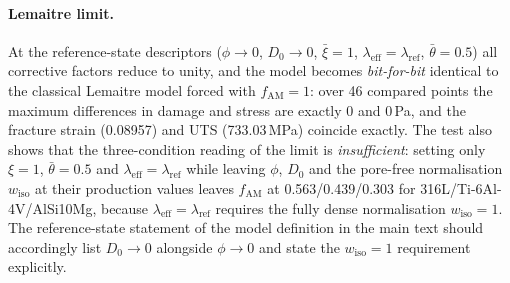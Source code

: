 \documentclass[11pt,a4paper,twocolumn]{article}
\begin{document}
\paragraph{Lemaitre limit.} At the reference-state descriptors ($\phi \to 0$, $D_0 \to 0$, $\bar\xi = 1$,
$\lambda_{\mathrm{eff}} = \lambda_{\mathrm{ref}}$, $\bar\theta = 0.5$) all corrective factors reduce to
unity, and the model becomes \emph{bit-for-bit} identical to the classical Lemaitre model forced with
$f_{\mathrm{AM}} = 1$: over 46 compared points the maximum differences in damage and stress are exactly
$0$ and $0$\,Pa, and the fracture strain (0.08957) and UTS (733.03\,MPa) coincide exactly. The test also
shows that the three-condition reading of the limit is \emph{insufficient}: setting only $\xi = 1$,
$\bar\theta = 0.5$ and $\lambda_{\mathrm{eff}} = \lambda_{\mathrm{ref}}$ while leaving $\phi$, $D_0$ and
the pore-free normalisation $w_{\mathrm{iso}}$ at their production values leaves $f_{\mathrm{AM}}$ at
0.563/0.439/0.303 for 316L/Ti-6Al-4V/AlSi10Mg, because $\lambda_{\mathrm{eff}} = \lambda_{\mathrm{ref}}$
requires the fully dense normalisation $w_{\mathrm{iso}} = 1$. The reference-state statement of the model
definition in the main text should accordingly list $D_0 \to 0$ alongside $\phi \to 0$ and state
the $w_{\mathrm{iso}} = 1$ requirement explicitly.
\end{document}
